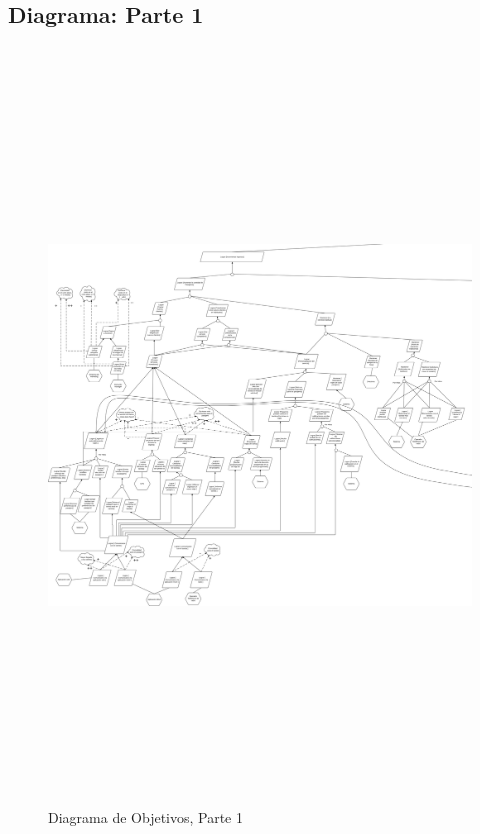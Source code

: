 \documentclass[a4paper, 10pt, twoside]{article}
\begin{document}
\subsection{Diagrama: Parte 1}
\begin{figure}[H]
  \includegraphics[angle=90,height=20cm]{diagramas/diagrama-objetivos-0.png}
  \caption{Diagrama de Objetivos, Parte 1}
  \label{fig:diagrama-objetivos-0}
\end{figure}
\newpage
\end{document}
